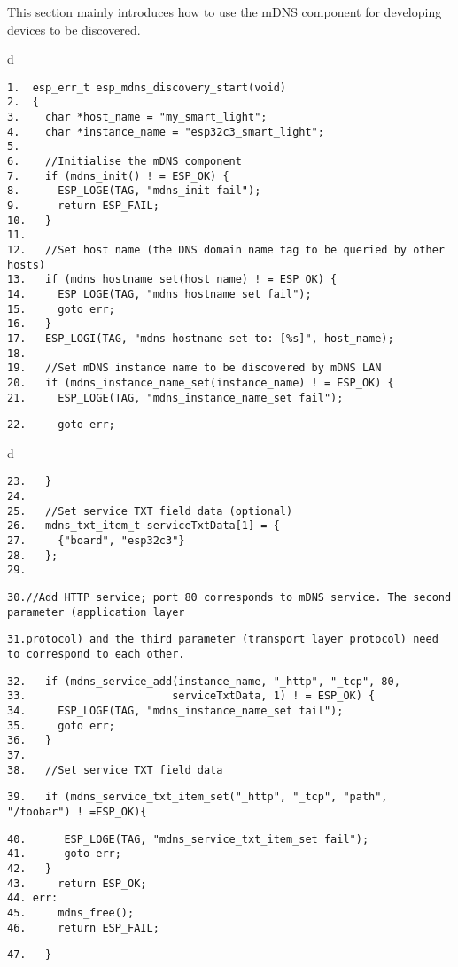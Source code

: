\documentclass[a4paper,12pt]{book}
\begin{document}
This section mainly introduces how to use the mDNS component for developing devices to be discovered.

\begin{codebloc}
\begin{tabular}{d}
\vspace{2pt}
\begin{verbatim}
1.  esp_err_t esp_mdns_discovery_start(void)
2.  {
3.    char *host_name = "my_smart_light";
4.    char *instance_name = "esp32c3_smart_light";
5.	
6.    //Initialise the mDNS component
7.    if (mdns_init() ! = ESP_OK) {
8.      ESP_LOGE(TAG, "mdns_init fail");
9.      return ESP_FAIL;
10.   }
11.	
12.   //Set host name (the DNS domain name tag to be queried by other hosts)
13.   if (mdns_hostname_set(host_name) ! = ESP_OK) {
14.     ESP_LOGE(TAG, "mdns_hostname_set fail");
15.     goto err;
16.   }
17.   ESP_LOGI(TAG, "mdns hostname set to: [%s]", host_name);
18.	
19.   //Set mDNS instance name to be discovered by mDNS LAN
20.   if (mdns_instance_name_set(instance_name) ! = ESP_OK) {
21.     ESP_LOGE(TAG, "mdns_instance_name_set fail");
\end{verbatim}
\verb|22.     goto err;|
\end{tabular}
\end{codebloc}

\begin{codebloc}
\begin{tabular}{d}
\vspace{2pt}
\begin{verbatim}
23.   }
24.	
25.   //Set service TXT field data (optional)
26.   mdns_txt_item_t serviceTxtData[1] = {
27.     {"board", "esp32c3"}
28.   };
29.	
\end{verbatim}
\verb|30.|\fontsize{8pt}{10pt}\selectfont\verb|//Add HTTP service; port 80 corresponds to mDNS service. The second parameter (application layer |

\footnotesize
\verb|31.|\fontsize{8pt}{10pt}\selectfont\verb|protocol) and the third parameter (transport layer protocol) need to correspond to each other.|
\footnotesize
\begin{verbatim}
32.   if (mdns_service_add(instance_name, "_http", "_tcp", 80,
33.                       serviceTxtData, 1) ! = ESP_OK) {
34.     ESP_LOGE(TAG, "mdns_instance_name_set fail");
35.     goto err;
36.   }
37.	
38.   //Set service TXT field data
\end{verbatim}
\verb|39.   |\fontsize{9.5pt}{10pt}\selectfont\verb|if (mdns_service_txt_item_set("_http", "_tcp", "path", "/foobar") ! =ESP_OK){|
\footnotesize
\begin{verbatim}
40.      ESP_LOGE(TAG, "mdns_service_txt_item_set fail");
41.      goto err;
42.   }
43.     return ESP_OK;
44.	err:
45.     mdns_free();
46.     return ESP_FAIL;
\end{verbatim}
\verb|47.	}|
\end{tabular}
\end{codebloc}
\end{document}
